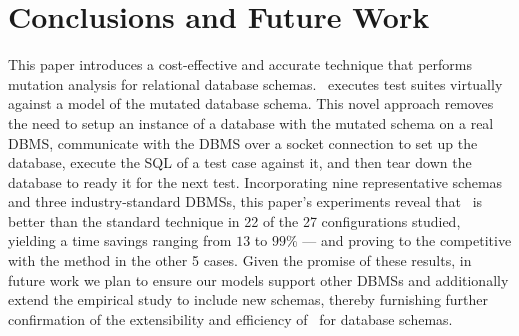 
\section{Conclusions and Future Work}
\label{sec:conclusions}


This paper introduces a cost-effective and accurate technique that performs mutation analysis for relational database schemas. \Vma~executes test suites virtually against a model of the mutated database schema. This novel approach removes the need to setup an instance of a database with the mutated schema on a real DBMS, communicate with the DBMS over a socket connection to set up the database, execute the SQL \INSERTs of a test case against it, and then tear down the database to ready it for the next test. Incorporating nine representative schemas and three industry-standard DBMSs, this paper's experiments reveal that \vma~is better than the standard technique in 22 of the 27 configurations studied, yielding a time savings ranging from $13$ to $99\%$ --- and proving to the competitive with the \Original method in the other 5 cases.  Given the promise of these results, in future work we plan to ensure our models support other DBMSs and additionally extend the empirical study to include new schemas, thereby furnishing further confirmation of the extensibility and efficiency of \vma~for database schemas.

